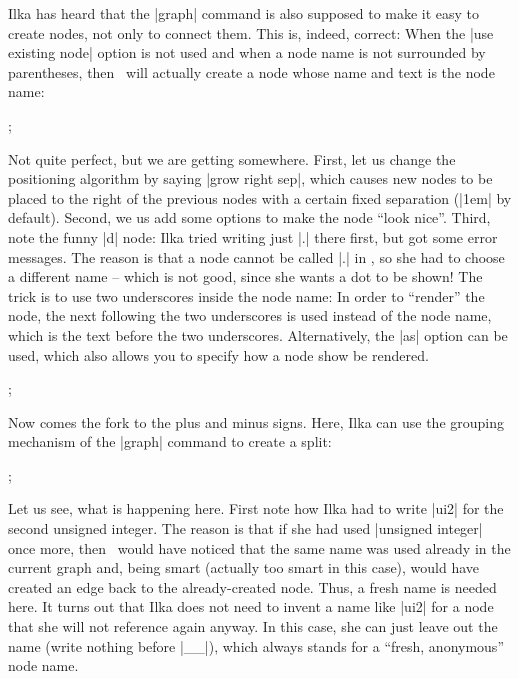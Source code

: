 Ilka has heard that the |graph| command is also supposed to make it
easy to create nodes, not only to connect them. This is, indeed,
correct: When the |use existing node| option is not used and when a
node name is not surrounded by parentheses, then \tikzname\ will
actually create a node whose name and text is the node name:
\begin{codeexample}[]
\tikz {};  
\end{codeexample}
Not quite perfect, but we are getting somewhere. First, let us change
the positioning algorithm by saying |grow right sep|, which causes new
nodes to be placed to the right of the previous nodes with a certain
fixed separation (|1em| by default). Second, we us add some options to
make the node ``look nice''. Third, note the funny |d| node: Ilka
tried writing just |.| there first, but got some error messages. The
reason is that a node cannot be called |.| in \tikzname, so she had to
choose a different name -- which is not good, since she wants a dot to
be shown! The trick is to use two underscores inside the node name: In
order to ``render'' the node, the next following the two underscores
is used instead of the node name, which is the text before the two
underscores. Alternatively, the |as| option can be used, which also
allows you to specify how a node show be rendered.
\begin{codeexample}[]
\tikz {};  
\end{codeexample}
Now comes the fork to the plus and minus signs. Here, Ilka can use the
grouping mechanism of the |graph| command to create a split:
\begin{codeexample}[]
\tikz {};  
\end{codeexample}
Let us see, what is happening here. First note how Ilka had to write
|ui2| for the second unsigned integer. The reason is
that if she had used |unsigned integer| once more, then \tikzname\
would have noticed that the same name was used already in the current
graph and, being smart (actually too smart in this case), would have
created an edge back to the already-created node. Thus, a fresh name
is needed here. It turns out that Ilka does not need to invent a name like
|ui2| for a node that she will not reference again
anyway. In this case, she can just leave out the name (write nothing
before |__|), which always stands for a ``fresh, anonymous'' node name.

